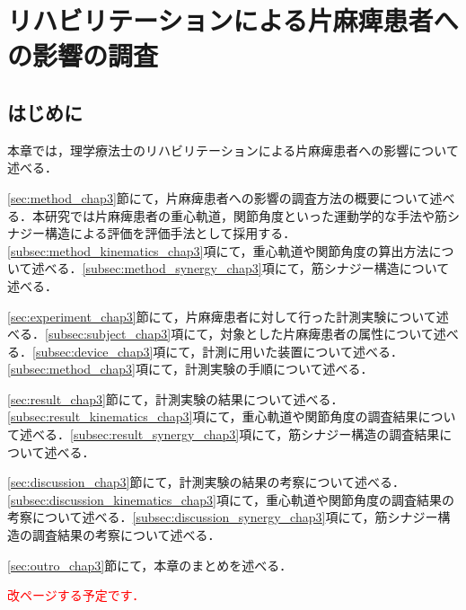 \chapter{リハビリテーションによる片麻痺患者への影響の調査}
\label{chap:investigation}
\minitoc

\thispagestyle{empty}

\newpage
\section{はじめに}
\label{sec:intro_chap3}

本章では，理学療法士のリハビリテーションによる片麻痺患者への影響について述べる．

\ref{sec:method_chap3}節にて，片麻痺患者への影響の調査方法の概要について述べる．本研究では片麻痺患者の重心軌道，関節角度といった運動学的な手法や筋シナジー構造による評価を評価手法として採用する．\ref{subsec:method_kinematics_chap3}項にて，重心軌道や関節角度の算出方法について述べる．\ref{subsec:method_synergy_chap3}項にて，筋シナジー構造について述べる．

\ref{sec:experiment_chap3}節にて，片麻痺患者に対して行った計測実験について述べる．\ref{subsec:subject_chap3}項にて，対象とした片麻痺患者の属性について述べる．\ref{subsec:device_chap3}項にて，計測に用いた装置について述べる．\ref{subsec:method_chap3}項にて，計測実験の手順について述べる．

\ref{sec:result_chap3}節にて，計測実験の結果について述べる．\ref{subsec:result_kinematics_chap3}項にて，重心軌道や関節角度の調査結果について述べる．\ref{subsec:result_synergy_chap3}項にて，筋シナジー構造の調査結果について述べる．

\ref{sec:discussion_chap3}節にて，計測実験の結果の考察について述べる．\ref{subsec:discussion_kinematics_chap3}項にて，重心軌道や関節角度の調査結果の考察について述べる．\ref{subsec:discussion_synergy_chap3}項にて，筋シナジー構造の調査結果の考察について述べる．

\ref{sec:outro_chap3}節にて，本章のまとめを述べる．

\textcolor{red}{改ページする予定です．}

